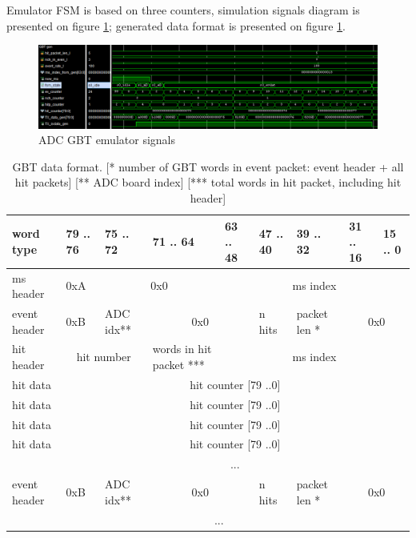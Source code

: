 \documentclass{article}
\begin{document}
Emulator FSM is based on three counters, simulation signals diagram is presented on figure \ref{fig:gbt-emu-sg}; generated data format is presented on figure \ref{tab:gbt-emu-format}.

\begin{figure}[H]
	\centering 
	\includegraphics[width=1.0\textwidth]{pic_signals/adc-gbt-emu.png}
	\caption{\label{fig:gbt-emu-sg} ADC GBT emulator signals}
\end{figure}

\begin{table}[H]
\centering
\begin{tabular}{| l | l | l | l | l | l | l | l | l |}
\hline
word type & 79 .. 76 & 75 .. 72 & 71 .. 64 & 63 .. 48 & 47 .. 40 & 39 .. 32 & 31 .. 16 & 15 .. 0 \\ \hline
ms header & 0xA & \multicolumn{2}{c|}{0x0}  & \multicolumn{5}{c|}{ms index} \\ \hline
event header & 0xB & ADC idx** & \multicolumn{2}{c|}{0x0} & n hits & packet len * & \multicolumn{2}{c|}{0x0} \\ \hline
hit header & \multicolumn{2}{c|}{hit number} & words in hit packet *** & \multicolumn{5}{c|}{ms index} \\ \hline
hit data & \multicolumn{8}{c|}{hit counter [79 ..0]} \\ \hline
hit data & \multicolumn{8}{c|}{hit counter [79 ..0]} \\ \hline
hit data & \multicolumn{8}{c|}{hit counter [79 ..0]} \\ \hline
hit data & \multicolumn{8}{c|}{hit counter [79 ..0]} \\ \hline
  & \multicolumn{8}{c|}{ ... } \\ \hline

event header & 0xB & ADC idx** & \multicolumn{2}{c|}{0x0} & n hits & packet len * & \multicolumn{2}{c|}{0x0} \\ \hline
  & \multicolumn{7}{c|}{ ... } \\ \hline

\end{tabular}
\caption{GBT data format. [* number of GBT words in event packet: event header + all hit packets] [** ADC board index] [*** total words in hit packet, including hit header]\label{tab:gbt-emu-format}}
\end{table}
\end{document}
